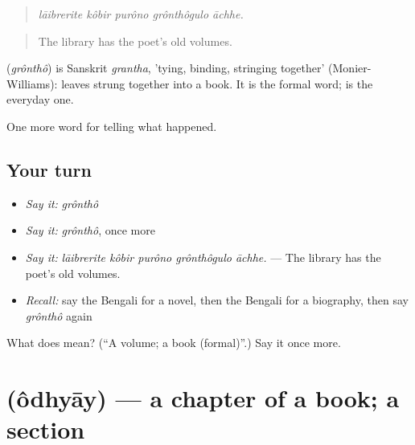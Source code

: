 \begin{quote}
    
\end{quote}

\begin{quote}
\emph{lāibrerite kôbir purôno grônthôgulo āchhe.}
\end{quote}

\begin{quote}
The library has the poet's old volumes.
\end{quote}

\begin{cousinweb}
\textbf{} (\emph{grônthô}) is Sanskrit \emph{grantha}, 'tying, binding, stringing together' (Monier-Williams): leaves strung together into a book. It is the formal word; \textbf{} is the everyday one.
\end{cousinweb}

\begin{grammarlens}[title={What you've built}]
One more word for telling what happened.
\end{grammarlens}

\subsection*{Your turn}
\begin{itemize}
\raggedright
  \item \emph{Say it:} \emph{grônthô}
  \item \emph{Say it:} \emph{grônthô}, once more
  \item \emph{Say it:} \emph{lāibrerite kôbir purôno grônthôgulo āchhe.} — The library has the poet's old volumes.
  \item \emph{Recall:} say the Bengali for a novel, then the Bengali for a biography, then say \emph{grônthô} again
\end{itemize}

\begin{tcolorbox}[breakable,colback=teal!4,colframe=teal!35!black,title={Before you move on}]
What does  mean? (\textquotedblleft{}A volume; a book (formal)\textquotedblright{}.) Say it once more.
\end{tcolorbox}
\section[\texorpdfstring{\bn{অধ্যায়} (ôdhyāy)}{অধ্যায় (ôdhyāy)}]{ (ôdhyāy) — a chapter of a book; a section}

